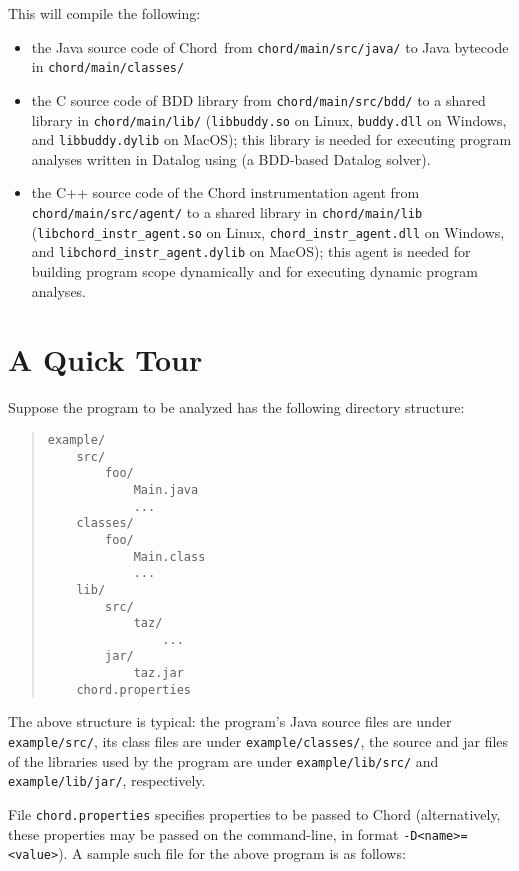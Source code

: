 \documentclass{article}
\providecommand\Chord{Chord}
\begin{document}
This will compile the following:
\begin{itemize}
\item
the Java source code of \Chord\ from {\tt chord/main/src/java/} to Java bytecode in {\tt chord/main/classes/}
\item
the C source code of BDD library  from {\tt chord/main/src/bdd/}
to a shared library in {\tt chord/main/lib/} ({\tt libbuddy.so} on Linux, {\tt buddy.dll} on Windows, and {\tt libbuddy.dylib} on MacOS);
this library is needed for executing program analyses written in Datalog using
 (a BDD-based Datalog solver).
\item
the C++ source code of the Chord instrumentation agent from {\tt chord/main/src/agent/} to a shared
library in {\tt chord/main/lib} ({\tt libchord\_instr\_agent.so} on Linux, {\tt chord\_instr\_agent.dll} on Windows,
and {\tt libchord\_instr\_agent.dylib} on MacOS); this agent is needed for building program scope dynamically
and for executing dynamic program analyses.
\end{itemize}

\texonly{\newpage}
\section{A Quick Tour}

Suppose the program to be analyzed has the following directory structure:

\begin{quote}
\begin{verbatim}
example/
    src/
        foo/
            Main.java
            ...
    classes/
        foo/
            Main.class
            ...
    lib/
        src/
            taz/
                ...
        jar/
            taz.jar
    chord.properties
\end{verbatim}
\end{quote}

The above structure is typical: the program's Java source files are under \verb+example/src/+,
its class files are under \verb+example/classes/+, the source and jar files of the libraries
used by the program are under \verb+example/lib/src/+ and \verb+example/lib/jar/+, respectively.

File \verb+chord.properties+ specifies properties to be passed to Chord (alternatively,
these properties may be passed on the command-line, in format \verb+-D<name>=<value>+).
A sample such file for the above program is as follows:
\end{document}
